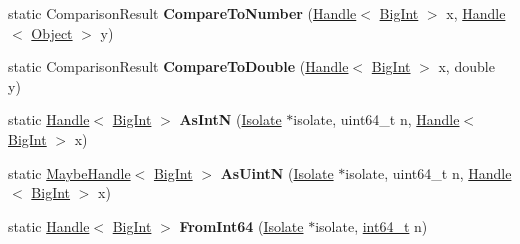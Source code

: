 \begin{DoxyCompactItemize}
\item 
\mbox{\label{classv8_1_1internal_1_1BigInt_a731216c3539d455b5ff6a7f28ee5cc08}} 
static Comparison\+Result {\bfseries Compare\+To\+Number} (\mbox{\hyperlink{classv8_1_1internal_1_1Handle}{Handle}}$<$ \mbox{\hyperlink{classv8_1_1internal_1_1BigInt}{Big\+Int}} $>$ x, \mbox{\hyperlink{classv8_1_1internal_1_1Handle}{Handle}}$<$ \mbox{\hyperlink{classv8_1_1internal_1_1Object}{Object}} $>$ y)
\item 
\mbox{\label{classv8_1_1internal_1_1BigInt_a681f6355319a36f0f617d2ff006ee5d5}} 
static Comparison\+Result {\bfseries Compare\+To\+Double} (\mbox{\hyperlink{classv8_1_1internal_1_1Handle}{Handle}}$<$ \mbox{\hyperlink{classv8_1_1internal_1_1BigInt}{Big\+Int}} $>$ x, double y)
\item 
\mbox{\label{classv8_1_1internal_1_1BigInt_aa6134775b820094609c322e8a488477a}} 
static \mbox{\hyperlink{classv8_1_1internal_1_1Handle}{Handle}}$<$ \mbox{\hyperlink{classv8_1_1internal_1_1BigInt}{Big\+Int}} $>$ {\bfseries As\+IntN} (\mbox{\hyperlink{classv8_1_1internal_1_1Isolate}{Isolate}} $\ast$isolate, uint64\+\_\+t n, \mbox{\hyperlink{classv8_1_1internal_1_1Handle}{Handle}}$<$ \mbox{\hyperlink{classv8_1_1internal_1_1BigInt}{Big\+Int}} $>$ x)
\item 
\mbox{\label{classv8_1_1internal_1_1BigInt_a6e46f286fd7d5f7c3109265d9bedf42a}} 
static \mbox{\hyperlink{classv8_1_1internal_1_1MaybeHandle}{Maybe\+Handle}}$<$ \mbox{\hyperlink{classv8_1_1internal_1_1BigInt}{Big\+Int}} $>$ {\bfseries As\+UintN} (\mbox{\hyperlink{classv8_1_1internal_1_1Isolate}{Isolate}} $\ast$isolate, uint64\+\_\+t n, \mbox{\hyperlink{classv8_1_1internal_1_1Handle}{Handle}}$<$ \mbox{\hyperlink{classv8_1_1internal_1_1BigInt}{Big\+Int}} $>$ x)
\item 
\mbox{\label{classv8_1_1internal_1_1BigInt_a92f1266cb08a3cb5f75b768e474943a1}} 
static \mbox{\hyperlink{classv8_1_1internal_1_1Handle}{Handle}}$<$ \mbox{\hyperlink{classv8_1_1internal_1_1BigInt}{Big\+Int}} $>$ {\bfseries From\+Int64} (\mbox{\hyperlink{classv8_1_1internal_1_1Isolate}{Isolate}} $\ast$isolate, \mbox{\hyperlink{classint64__t}{int64\+\_\+t}} n)
\item 

\end{DoxyCompactItemize}
